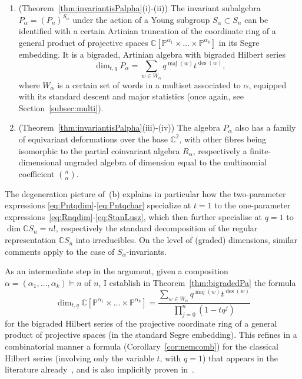 \documentclass[a4paper,11pt]{amsart}
\theoremstyle{plain}
\theoremstyle{definition}
\newcommand{\C}{\mathbb{C}}
\renewcommand{\P}{\mathbb{P}}
\DeclareMathOperator{\maj}{maj}
\DeclareMathOperator{\des}{des}
\begin{document}
\begin{enumerate}
\item[(d)] (Theorem~\ref{thm:invariantisPalpha}(i)-(ii)) The invariant subalgebra $P_\alpha = (P_n)^{S_\alpha}$ under the action of a Young subgroup $S_\alpha\subset S_n$ can be identified
with a certain Artinian truncation of the coordinate ring of a general product of projective
spaces $\C[\P^{\alpha_1}\times\ldots\times\P^{\alpha_k}]$ in its Segre embedding. It is a bigraded, Artinian algebra with bigraded Hilbert series
\begin{equation}\label{eq:Patqdim}
\dim_{t,q}  P_\alpha=  \sum_{w\in W_\alpha} q^{\maj(w)}t^{\des(w)},    
\end{equation}
where $W_\alpha$ is a certain set of words in a multiset associated to $\alpha$, equipped with its standard
descent and major statistics (once again, see Section~\ref{subsec:multi}). 

\item[(e)] (Theorem~\ref{thm:invariantisPalpha}(iii)-(iv)) 
The algebra $P_\alpha$ also has a family of equivariant deformations over the base $\C^2$, with other fibres being isomorphic to 
the partial coinvariant algebra $R_\alpha$, respectively a finite-dimensional ungraded algebra of dimension
equal to the multinomial coefficient ${n\choose \alpha}$.  
\end{enumerate}

The degeneration picture of~(b) explains in particular how the two-parameter expressions \eqref{eq:Pntqdim}-\eqref{eq:Pntqchar} specialize at $t=1$ to the one-parameter expressions~\eqref{eq:Rnqdim}-\eqref{eq:StanLusz}, 
which then further specialise at $q=1$ to $\dim \C S_n = n!$, respectively the standard decomposition of the regular representation $\C S_n$
into irreducibles. On the level of (graded) dimensions, similar comments apply to the case of $S_\alpha$-invariants. 

As an intermediate step in the argument, given a composition $\alpha=(\alpha_1, \ldots, \alpha_k) \vDash n$ of $n$, I establish in Theorem~\ref{thm:bigradedPa} the formula
\[
\dim_{t,q}  \C[\P^{\alpha_1}\times\ldots\times\P^{\alpha_k}]=  \frac{ \displaystyle\sum_{w\in W_\alpha} q^{\maj(w)}t^{\des(w)}}{ \displaystyle\prod_{j=0}^n (1-tq^j)}
\]
for the bigraded Hilbert series of the projective coordinate ring of a general product of projective spaces (in the standard
Segre embedding). This refines in a combinatorial manner a formula (Corollary~\ref{cor:nemcomb}) for the classical Hilbert series (involving only the variable $t$, with $q=1$) that appears in the literature already~\cite{morales}, and is also implicitly proven in~\cite{ORS}. 
\end{document}
